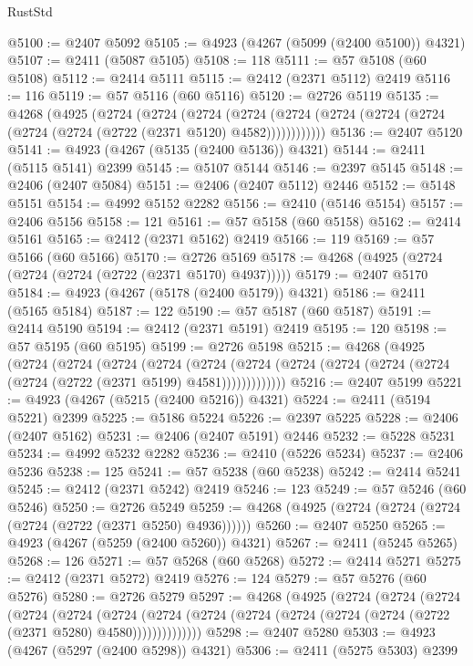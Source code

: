 \begin{lexlean}{RustStd}
\begin{coremodule}
@5100 := @2407 @5092
@5105 := @4923 (@4267 (@5099 (@2400 @5100)) @4321)
@5107 := @2411 (@5087 @5105)
@5108 := 118
@5111 := @57 @5108 (@60 @5108)
@5112 := @2414 @5111
@5115 := @2412 (@2371 @5112) @2419
@5116 := 116
@5119 := @57 @5116 (@60 @5116)
@5120 := @2726 @5119
@5135 := @4268
    (@4925
      (@2724
        (@2724
          (@2724
            (@2724 (@2724 (@2724 (@2724 (@2724 (@2724 (@2724 (@2722 (@2371 @5120) @4582))))))))))))
@5136 := @2407 @5120
@5141 := @4923 (@4267 (@5135 (@2400 @5136)) @4321)
@5144 := @2411 (@5115 @5141) @2399
@5145 := @5107 @5144
@5146 := @2397 @5145
@5148 := @2406 (@2407 @5084)
@5151 := @2406 (@2407 @5112) @2446
@5152 := @5148 @5151
@5154 := @4992 @5152 @2282
@5156 := @2410 (@5146 @5154)
@5157 := @2406 @5156
@5158 := 121
@5161 := @57 @5158 (@60 @5158)
@5162 := @2414 @5161
@5165 := @2412 (@2371 @5162) @2419
@5166 := 119
@5169 := @57 @5166 (@60 @5166)
@5170 := @2726 @5169
@5178 := @4268 (@4925 (@2724 (@2724 (@2724 (@2722 (@2371 @5170) @4937)))))
@5179 := @2407 @5170
@5184 := @4923 (@4267 (@5178 (@2400 @5179)) @4321)
@5186 := @2411 (@5165 @5184)
@5187 := 122
@5190 := @57 @5187 (@60 @5187)
@5191 := @2414 @5190
@5194 := @2412 (@2371 @5191) @2419
@5195 := 120
@5198 := @57 @5195 (@60 @5195)
@5199 := @2726 @5198
@5215 := @4268
    (@4925
      (@2724
        (@2724
          (@2724
            (@2724
              (@2724
                (@2724 (@2724 (@2724 (@2724 (@2724 (@2724 (@2722 (@2371 @5199) @4581)))))))))))))
@5216 := @2407 @5199
@5221 := @4923 (@4267 (@5215 (@2400 @5216)) @4321)
@5224 := @2411 (@5194 @5221) @2399
@5225 := @5186 @5224
@5226 := @2397 @5225
@5228 := @2406 (@2407 @5162)
@5231 := @2406 (@2407 @5191) @2446
@5232 := @5228 @5231
@5234 := @4992 @5232 @2282
@5236 := @2410 (@5226 @5234)
@5237 := @2406 @5236
@5238 := 125
@5241 := @57 @5238 (@60 @5238)
@5242 := @2414 @5241
@5245 := @2412 (@2371 @5242) @2419
@5246 := 123
@5249 := @57 @5246 (@60 @5246)
@5250 := @2726 @5249
@5259 := @4268 (@4925 (@2724 (@2724 (@2724 (@2724 (@2722 (@2371 @5250) @4936))))))
@5260 := @2407 @5250
@5265 := @4923 (@4267 (@5259 (@2400 @5260)) @4321)
@5267 := @2411 (@5245 @5265)
@5268 := 126
@5271 := @57 @5268 (@60 @5268)
@5272 := @2414 @5271
@5275 := @2412 (@2371 @5272) @2419
@5276 := 124
@5279 := @57 @5276 (@60 @5276)
@5280 := @2726 @5279
@5297 := @4268
    (@4925
      (@2724
        (@2724
          (@2724
            (@2724
              (@2724
                (@2724
                  (@2724 (@2724 (@2724 (@2724 (@2724 (@2724 (@2722 (@2371 @5280) @4580))))))))))))))
@5298 := @2407 @5280
@5303 := @4923 (@4267 (@5297 (@2400 @5298)) @4321)
@5306 := @2411 (@5275 @5303) @2399

\end{coremodule}
\end{lexlean}
